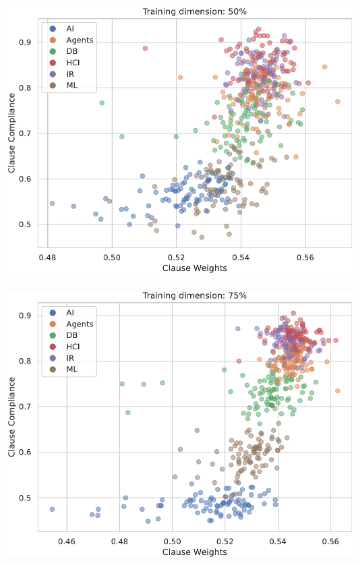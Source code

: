 \begin{figure}
\begin{subfigure}{.5\textwidth}
		\label{fig:vv}	
	\end{subfigure}\\
	\begin{subfigure}{.5\textwidth}
	\centering
	\includegraphics[width=0.95\linewidth]{figures/scatter_50.pdf}
	\label{fig:cc}
\end{subfigure}%
\begin{subfigure}{.5\textwidth}
	\centering
	\includegraphics[width=0.95\linewidth]{figures/scatter_75.pdf}
	\label{fig:dd}	
\end{subfigure}\\
\begin{subfigure}{0.5\textwidth}

\end{subfigure}
\end{figure}
